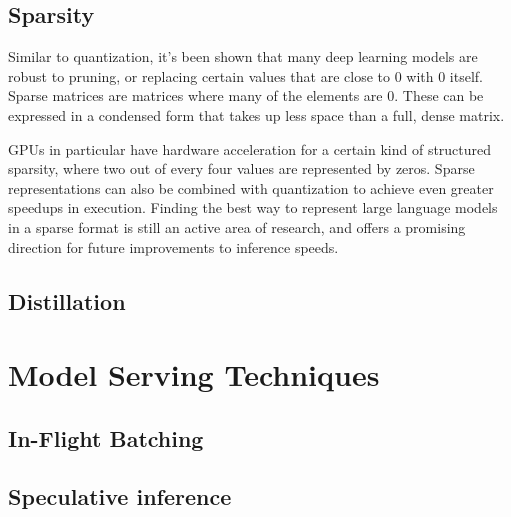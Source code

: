 \subsection{Sparsity}

Similar to quantization, it's been shown that many deep learning models are robust to pruning, or replacing certain values that are close to 0 with 0 itself. Sparse matrices are matrices where many of the elements are 0. These can be expressed in a condensed form that takes up less space than a full, dense matrix.

GPUs in particular have hardware acceleration for a certain kind of structured sparsity, where two out of every four values are represented by zeros. Sparse representations can also be combined with quantization to achieve even greater speedups in execution. Finding the best way to represent large language models in a sparse format is still an active area of research, and offers a promising direction for future improvements to inference speeds.

\subsection{Distillation}


\section{Model Serving Techniques}

\subsection{In-Flight Batching}
\subsection{Speculative inference}
